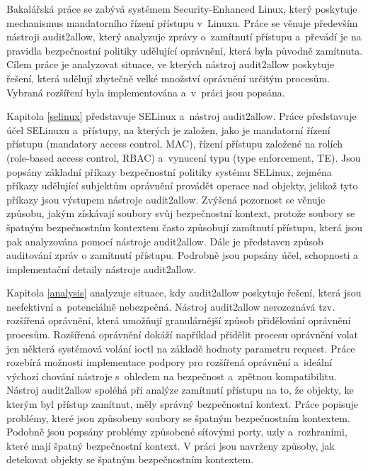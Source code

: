 Bakalářská práce se zabývá systémem Security-Enhanced Linux, který poskytuje
me\-cha\-nismus mandatorního řízení přístupu v~Linuxu. Práce se věnuje především
nástroji \mbox{audit2allow}, který analyzuje zprávy o~zamítnutí přístupu
a~převádí je na pravidla bez\-peč\-nost\-ní politiky udělující oprávnění, která byla
původně zamítnuta. Cílem práce je analyzovat situace, ve kterých nástroj
audit2allow poskytuje řešení, která udělují zbytečně velké množství oprávnění
určitým procesům. Vybraná rozšíření byla implementována a~v~práci jsou popsána.

Kapitola \ref{selinux} představuje SELinux a~nástroj audit2allow. Práce
představuje účel SE\-Li\-nu\-xu a~přístupy, na kterých je založen, jako je
mandatorní řízení přístupu (mandatory access control, MAC), řízení přístupu
založené na rolích (role-based access control, RBAC) a~vynucení typu (type
enforcement, TE).  Jsou popsány základní příkazy bezpečnostní politiky systému
SELi\-nux, zejména příkazy udělující subjektům oprávnění provádět operace nad
objekty, jelikož tyto příkazy jsou výstupem nástroje audit2allow. Zvýšená
pozornost se věnuje způsobu, jakým získávají soubory svůj bezpečnostní
kontext, protože soubory se špatným bezpečnostním kontextem často způsobují
zamítnutí přístupu, která jsou pak analyzována pomocí nástroje audit2allow. Dále
je představen způsob auditování zpráv o zamítnutí přístupu. Podrobně jsou
popsány účel, schopnosti a implementační detaily nástroje audit2allow.

Kapitola \ref{analysis} analyzuje situace, kdy audit2allow poskytuje řešení,
která jsou neefektivní a~potenciálně nebezpečná. Nástroj audit2allow nerozeznává
tzv. rozšířená oprávnění, která umožňují granulárnější způsob přidělování
oprávnění procesům. Rozšířená oprávnění dokáží například přidělit procesu
oprávnění volat jen některá systémová volání ioctl na základě hodnoty parametru
request. Práce rozebírá možnosti implementace podpory pro rozšířená oprávnění
a~ideální výchozí chování nástroje s~ohledem na bezpečnost a~zpětnou
kom\-pa\-tibilitu.
Nástroj audit2allow spoléhá při analýze zamítnutí přístupu na to, že
objekty, ke kterým byl přístup zamítnut, měly správný bezpečnostní kontext.
Práce popisuje problémy, které jsou způsobeny soubory se špatným bezpečnostním
kontextem. Podobně jsou popsány problémy způsobené síťovými porty, uzly
a~rozhraními, které mají špatný bezpečnostní kontext. V práci jsou navrženy
způsoby, jak detekovat objekty se špatným bezpečnostním kontextem.

